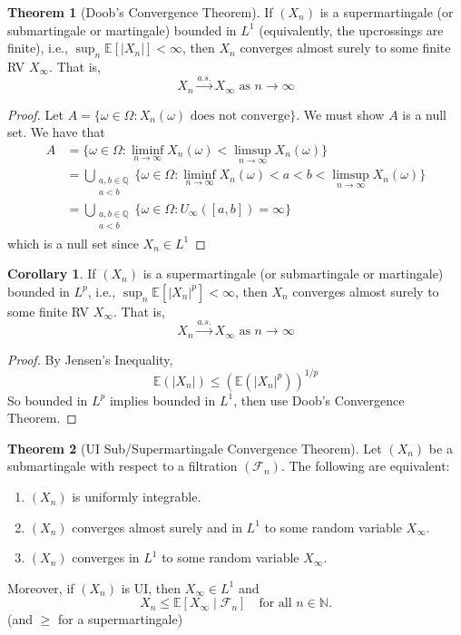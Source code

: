 \documentclass[11pt,a4paper]{article}
\theoremstyle{definition}
\newtheorem{theorem}{Theorem}[section]
\newtheorem{corollary}{Corollary}[section]
\begin{document}
\begin{theorem}[Doob's Convergence Theorem]\label{thm:doob_convergence}
If $(X_n)$ is a supermartingale (or submartingale or martingale) bounded in $L^1$ (equivalently, the upcrossings are finite), i.e., $\sup_n \mathbb{E}[|X_n|] < \infty$, then $X_n$ converges almost surely to some finite RV $X_\infty$. That is, \[
X_n \xrightarrow{a.s.}X_\infty \text{ as } n \to \infty
\]
\end{theorem}

\begin{proof}
    Let $A = \{\omega \in \Omega: X_n (\omega) \text{ does not converge}\}$. We must show $A$ is a null set. We have that \begin{align*}
        A & = \{\omega \in \Omega: \liminf \limits _{n \to \infty} X_n (\omega) < \limsup \limits _{n \to \infty} X_n (\omega)\} \\ & = \bigcup \limits _{\substack{a,b \in \mathbb{Q}\\ a < b} } \{ \omega \in \Omega : \liminf \limits _{n \to \infty} X_n(\omega) < a <b<\limsup \limits _{n \to \infty} X_n (\omega)\} \\ & = \bigcup \limits _{\substack{a,b \in \mathbb{Q}\\ a < b} } \{\omega \in \Omega: U_{\infty} ([a,b]) = \infty\}
    \end{align*}
    which is a null set since $X_n \in L^1$
\end{proof}

\begin{corollary}
If $(X_n)$ is a supermartingale (or submartingale or martingale) bounded in $L^p$, i.e., $\sup_n \mathbb{E}[|X_n|^p] < \infty$, then $X_n$ converges almost surely to some finite RV $X_\infty$. That is, \[
X_n \xrightarrow{a.s.}X_\infty \text{ as } n \to \infty
\]
\end{corollary}

\begin{proof}
By Jensen's Inequality, \[
\mathbb{E}(|X_n|) \le (\mathbb{E}(|X_n|^p))^{1/p}
\]
So bounded in $L^p$ implies bounded in $L^1$, then use Doob's Convergence Theorem.
\end{proof}

\begin{theorem}[UI Sub/Supermartingale Convergence Theorem]
Let $(X_n)$ be a submartingale with respect to a filtration $(\mathcal{F}_n)$. The following are equivalent:
\begin{enumerate}
    \item $(X_n)$ is uniformly integrable.
    
    \item $(X_n)$ converges almost surely and in $L^1$ to some random variable $X_\infty$.
    
    \item $(X_n)$ converges in $L^1$ to some random variable $X_\infty$.
\end{enumerate}
Moreover, if $(X_n)$ is UI, then $X_\infty \in L^1$ and
\[
X_n \leq \mathbb{E}[X_\infty \mid \mathcal{F}_n] \quad \text{for all } n \in \mathbb{N}.
\]
(and $\ge$ for a supermartingale)
\end{theorem}
\end{document}
